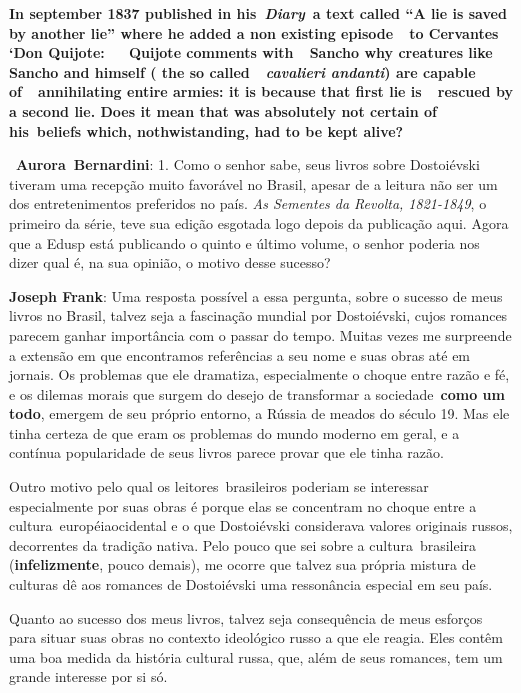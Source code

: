 \textbf{In september 1837  published in his~\emph{Diary}~a text called
``A lie is saved by another lie'' where he added a non existing
episode~~to Cervantes `Don Quijote:~~~Quijote comments with~~Sancho why
creatures like Sancho and himself ( the so called~~\emph{cavalieri
andanti}) are capable of~~annihilating entire armies: it is because that
first lie is~~rescued by a second lie. Does it mean that  was
absolutely not certain of his~beliefs which, nothwistanding, had to be
kept alive?~~}

~\textbf{Aurora~Bernardini}: 1. Como o senhor sabe, seus livros sobre
Dostoiévski tiveram uma recepção muito favorável no Brasil, apesar de a
leitura não ser um dos entretenimentos preferidos no país. \emph{As Sementes
da Revolta, 1821-1849}, o primeiro da série, teve sua edição esgotada
logo depois da publicação aqui. Agora que a Edusp está publicando o
quinto e último volume, o senhor poderia nos dizer qual é, na sua
opinião, o motivo desse sucesso?

\textbf{Joseph Frank}: Uma resposta possível a essa pergunta, sobre o
sucesso de meus livros no Brasil, talvez seja a fascinação mundial por
Dostoiévski, cujos romances parecem ganhar importância com o passar do
tempo. Muitas vezes me surpreende a extensão em que encontramos
referências a seu nome e suas obras até em jornais. Os problemas que ele
dramatiza, especialmente o choque entre razão e fé, e os dilemas morais
que surgem do desejo de transformar a sociedade~\textbf{como um todo},
emergem de seu próprio entorno, a Rússia de meados do século 19. Mas ele
tinha certeza de que eram os problemas do mundo moderno em geral, e a
contínua popularidade de seus livros parece provar que ele tinha razão.

Outro motivo pelo qual os leitores~brasileiros poderiam se interessar
especialmente por suas obras é porque elas se concentram no choque entre
a cultura~européiaocidental e o que Dostoiévski considerava valores
originais russos, decorrentes da tradição nativa. Pelo pouco que sei
sobre a cultura~brasileira (\textbf{infelizmente}, pouco demais), me
ocorre que talvez sua própria mistura de culturas dê aos romances de
Dostoiévski uma ressonância especial em seu país.

Quanto ao sucesso dos meus livros, talvez seja consequência de meus
esforços para situar suas obras no contexto ideológico russo a que ele
reagia. Eles contêm uma boa medida da história cultural russa, que, além
de seus romances, tem um grande interesse por si só.

